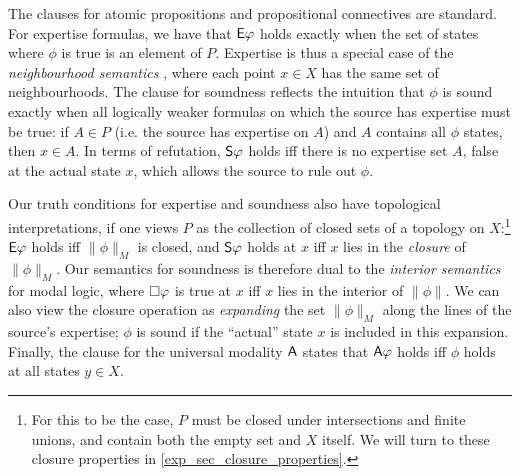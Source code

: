 The clauses for atomic propositions and propositional
connectives are standard. For expertise formulas, we have that $\E\phi$
holds exactly when the set of states where $\phi$ is true is an element
of $P$. Expertise is thus a special case of the \emph{neighbourhood semantics}
\cite{Scott1970,montague1970universal,pacuit2017neighborhood}, where each point $x \in X$ has the same
set of neighbourhoods. The clause for soundness reflects the intuition that
$\phi$ is sound exactly when all logically weaker formulas on which the
source has expertise must be true: if $A \in P$ (i.e. the source has
expertise on $A$) and $A$ contains all $\phi$ states, then
$x \in A$. In terms of refutation, $\S\phi$ holds iff there is no
expertise set $A$, false at the actual state $x$, which allows the
source to rule out $\phi$.

Our truth conditions for expertise and soundness also have topological
interpretations, if one views $P$ as the collection of closed sets of a
topology on $X$:\footnote{For this to be the case, $P$ must be closed under
intersections and finite unions, and contain both the empty set and $X$ itself.
We will turn to these closure properties in \cref{exp_sec_closure_properties}.}
$\E\phi$ holds iff $\|\phi\|_M$ is closed, and $\S\phi$ holds at $x$ iff $x$
lies in the \emph{closure} of $\|\phi\|_M$. Our semantics for soundness is
therefore dual to the \emph{interior semantics} for modal logic, where
$\modalnec\phi$ is true at $x$ iff $x$ lies in the interior of $\|\phi\|$. We
can also view the closure operation as \emph{expanding} the set $\|\phi\|_M$
along the lines of the source's expertise; $\phi$ is sound if the ``actual''
state $x$ is included in this expansion.
%
Finally, the clause for the universal modality $\A$ states that $\A\phi$ holds
iff $\phi$ holds at all states $y \in X$.

\footnotetext{
}

\def\w{1}
\def\h{0.5}
\newcommand{\examplemodel}{
    \tikzset{mynode/.style={color=black}}
    \node[mynode] (a) at (0, 0) {\large $ipd$};
    \node[mynode] (b) at (\w, 0) {\large $pd$};
    \node[mynode] (c) at (0, \h) {\large $ip$};
    \node[mynode] (d) at (\w, \h) {\large $p$};
    \node[mynode] (e) at (0, 2*\h) {\large $id$};
    \node[mynode] (f) at (\w, 2*\h) {\large $d$};
    \node[mynode] (g) at (0, 3*\h) {\large $i$};
    \node[mynode] (h) at (\w, 3*\h) {\large $\emptyset$};
}

